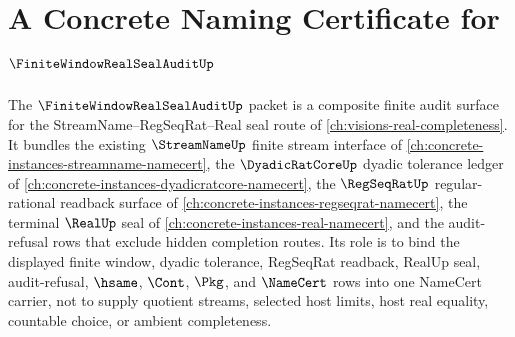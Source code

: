 \chapter{A Concrete Naming Certificate for $\FiniteWindowRealSealAuditUp$}
\label{ch:concrete-instances-finite-window-real-seal-audit-namecert}

The $\FiniteWindowRealSealAuditUp$ packet is a composite finite audit surface for the StreamName--RegSeqRat--Real seal route of \autoref{ch:visions-real-completeness}. It bundles the existing $\StreamNameUp$ finite stream interface of \autoref{ch:concrete-instances-streamname-namecert}, the $\DyadicRatCoreUp$ dyadic tolerance ledger of \autoref{ch:concrete-instances-dyadicratcore-namecert}, the $\RegSeqRatUp$ regular-rational readback surface of \autoref{ch:concrete-instances-regseqrat-namecert}, the terminal $\RealUp$ seal of \autoref{ch:concrete-instances-real-namecert}, and the audit-refusal rows that exclude hidden completion routes. Its role is to bind the displayed finite window, dyadic tolerance, RegSeqRat readback, RealUp seal, audit-refusal, $\hsame$, $\Cont$, $\Pkg$, and $\NameCert$ rows into one NameCert carrier, not to supply quotient streams, selected host limits, host real equality, countable choice, or ambient completeness.



